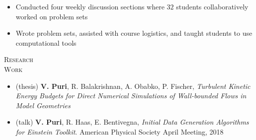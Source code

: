\documentclass[10pt]{article}
\begin{document}
\begin{multicols}{2}
\vspace{-2.0em}
\begin{itemize}[label=-]
    \setlength\itemsep{-0.5em}
    \item Conducted four weekly discussion sections where $32$ students collaboratively worked on problem sets
    \item Wrote problem sets, assisted with course logistics, and taught students to use computational tools
\end{itemize}
\vspace{-2.0em}

\end{multicols}
\vspace{-1.5em}
\begin{multicols}{2}
\textsc{\small Research \\ Work}
\columnbreak

\vspace{-2.0em}
\begin{itemize}[label= ]
    \setlength{\itemindent}{-2.5em}
    \setlength\itemsep{-0.5\itemsep}
    \item (thesis) \textbf{V. Puri}, R. Balakrishnan, A. Obabko, P. Fischer, {\sl Turbulent Kinetic Energy Budgets for Direct Numerical Simulations of Wall-bounded Flows in Model Geometries} 
    \item (talk) \textbf{V. Puri}, R. Haas, E. Bentivegna, {\sl Initial Data Generation Algorithms for Einstein Toolkit}. American Physical Society April Meeting, 2018
\end{itemize}
\vspace{-2.0em}


\end{multicols}
\vspace{-1.5em}
\end{document}
